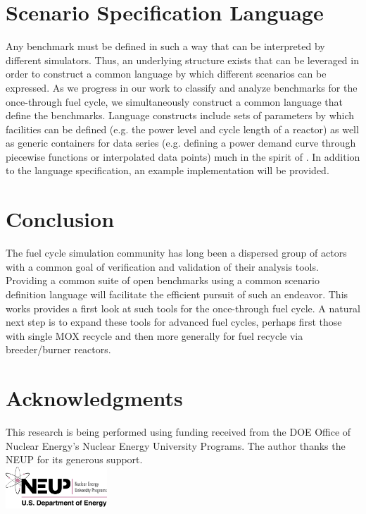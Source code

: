 \documentclass{anstrans}
\begin{document}
\section{Scenario Specification Language}
Any benchmark must be defined in such a way that can be interpreted by
different simulators. Thus, an underlying structure exists that can be
leveraged in order to construct a common language by which different
scenarios can be expressed. As we progress in our work to classify and
analyze benchmarks for the once-through fuel cycle, we simultaneously
construct a common language that define the benchmarks. Language 
constructs include sets of parameters by which facilities can be
defined (e.g. the power level and cycle length of a reactor) as well
as generic containers for data series (e.g. defining a power demand 
curve through piecewise functions or interpolated data points) much
in the spirit of \cite{mattoon_gneralized_2012}. In addition to the
language specification, an example implementation will be provided.

\section{Conclusion}
The fuel cycle simulation community has long been a dispersed group of
actors with a common goal of verification and validation of their
analysis tools. Providing a common suite of open benchmarks using a
common scenario definition language will facilitate the efficient
pursuit of such an endeavor. This works provides a first look at such
tools for the once-through fuel cycle. A natural next step is to
expand these tools for advanced fuel cycles, perhaps first those with
single MOX recycle and then more generally for fuel recycle via
breeder/burner reactors.

\section{Acknowledgments}
This research is being performed using funding received from the DOE
Office of Nuclear Energy's Nuclear Energy University Programs.  The
author thanks the NEUP for its generous support.\\
\includegraphics[width=1.5in]{neup_logo_large.jpg}


\end{document}
